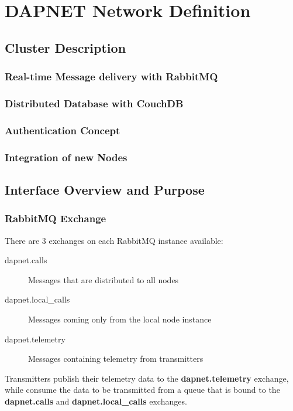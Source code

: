 \chapter{DAPNET Network Definition}

\section{Cluster Description}

\subsection{Real-time Message delivery with RabbitMQ}
\label{dapnetdef:clusterdesc:rabbitmq}

\subsection{Distributed Database with CouchDB}
\label{dapnetdef:clusterdesc:couchdb}

\subsection{Authentication Concept}

\subsection{Integration of new Nodes}


\section{Interface Overview and Purpose}

\subsection{RabbitMQ Exchange}
There are 3 exchanges on each RabbitMQ instance available:
\begin{description}
\item[dapnet.calls] Messages that are distributed to all nodes
\item[dapnet.local\_calls] Messages coming only from the local node instance
\item[dapnet.telemetry] Messages containing telemetry from transmitters
\end{description}

Transmitters publish their telemetry data to the \textbf{dapnet.telemetry}
exchange, while consume the data to be transmitted from a queue that is bound to
the \textbf{dapnet.calls} and \textbf{dapnet.local\_calls} exchanges.

